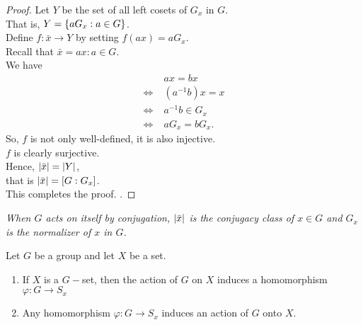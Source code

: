 \documentclass[../main-sheet.tex]{subfiles}
\begin{document}
\begin{proof}
    Let \(Y\) be the set of all left cosets of \(G_x\) in \(G\).\\
    That is, \(Y = \left\{aG_x: a \in G\right\}\).\\
    Define \(f: \bar{x} \to Y \) by setting \(f(ax) = aG_x\).\\
    Recall that \(\bar{x} = {ax: a \in G}\).\\
    We have
    \begin{align*}
        &ax = bx\\
        \Leftrightarrow\;& (a^{-1}b)x = x\\
        \Leftrightarrow\;& a^{-1} b \in G_x\\
        \Leftrightarrow\;& aG_x = bG_x.
    \end{align*}
    So, \(f\) is not only well-defined, it is also injective.\\
    \(f\) is clearly surjective.\\
    Hence, \(\left\vert\bar{x}\right\vert = \left\vert Y\right\vert\),\\
    that is \(\left\vert\bar{x}\right\vert = [G: G_x]\).\\
    This completes the proof. .
\end{proof}
\emph{When \(G\) acts on itself by conjugation, \(\left\vert\bar{x}\right\vert\) is the conjugacy class of \(x \in G\) and \(G_x\) is the normalizer of \(x\) in \(G\).}
\begin{thm}
    Let \(G\) be a group and let \(X\) be a set.
    \begin{enumerate}[label=(\roman*)]
        \item If \(X\) is a \(G-\)set, then the action of \(G\) on \(X\) induces a homomorphism \(\varphi : G\to S_x\)
        \item Any homomorphism \(\varphi : G\to S_x\) induces an action of \(G\) onto \(X\).
    \end{enumerate}
\end{thm}
\end{document}
